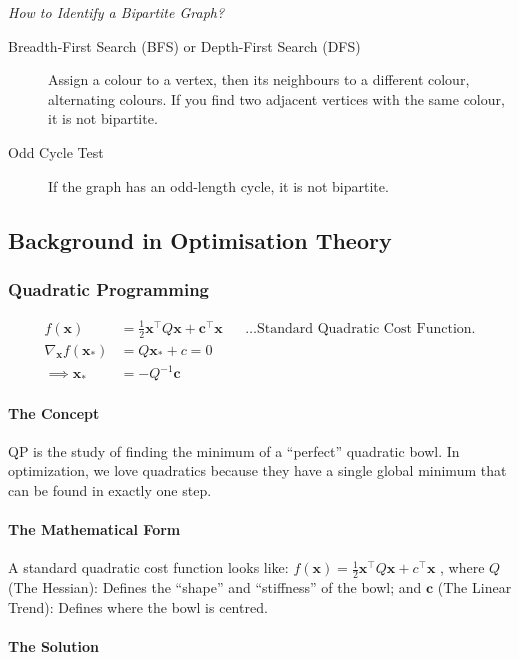 \documentclass[11pt]{article}
\begin{document}
\emph{How to Identify a Bipartite Graph?}
\begin{description}
\item[{Breadth-First Search (BFS) or Depth-First Search (DFS)}] Assign
a colour to a vertex, then its neighbours to a
different colour, alternating colours. If you find
two adjacent vertices with the same colour, it is not
bipartite.
\item[{Odd Cycle Test}] If the graph has an odd-length
cycle, it is not bipartite.
\end{description}
\subsection{Background in Optimisation Theory}
\label{sec:orge88bfde}

\subsubsection{Quadratic Programming}
\label{sec:org2da2fb1}

\begin{align*}
  f(\mathbf{x})
  &= \frac12 \mathbf{x}^{\top}Q\mathbf{x} +
    \mathbf{c}^{\top}\mathbf{x}
  && \text{\ldots Standard Quadratic Cost Function.}
  \\
  \nabla_{\mathbf{x}}f(\mathbf{x}_{*})
  &= Q\mathbf{x}_* + c = 0
  \\
  \implies \mathbf{x}_*
  &= -Q^{-1}\mathbf{c}
\end{align*}
\paragraph*{The Concept}
\label{sec:org643802e}
QP is the study of finding the minimum of a ``perfect''
quadratic bowl.  In optimization, we love quadratics
because they have a single global minimum that can be
found in exactly one step.
\paragraph*{The Mathematical Form}
\label{sec:orgb9dcfea}

A standard quadratic cost function looks like:
\(f(\mathbf{x}) = \frac{1}{2}\mathbf{x}^{\top} Q
\mathbf{x} + c^{\top} \mathbf{x}\) , where \(Q\) (The
Hessian): Defines the ``shape'' and ``stiffness'' of the
bowl; and \(\mathbf{c}\) (The Linear Trend): Defines
where the bowl is centred.
\paragraph*{The Solution}
\label{sec:org3d6d821}
\end{document}
